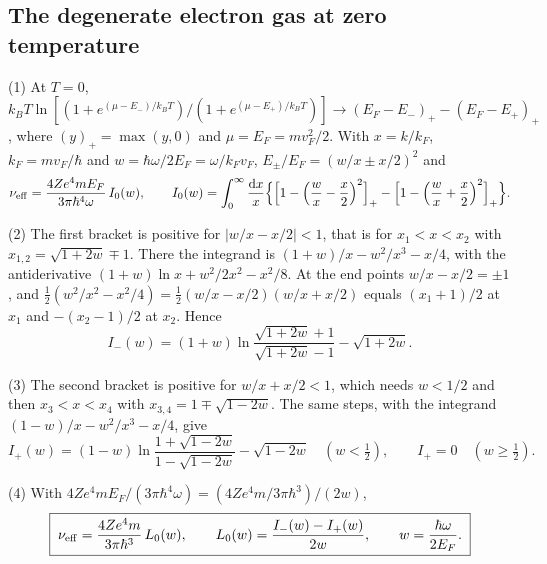 \documentclass[11pt]{article}
\numberwithin{equation}{section}
\newcommand{\nueff}{\nu_{\rm eff}}
\newcommand{\dd}{\mathrm d}
\newcommand{\kB}{k_B}
\begin{document}
\subsection{The degenerate electron gas at zero temperature}
{\noindent}(1) At $T=0$, $\kB T\ln[(1+e^{(\mu-E_-)/\kB T})/(1+e^{(\mu-E_+)/\kB T})]
\to(E_F-E_-)_+-(E_F-E_+)_+$, where $(y)_+=\max(y,0)$ and $\mu=E_F=mv_F^2/2$.
With $x=k/k_F$, $k_F=mv_F/\hbar$ and $w=\hbar\omega/2E_F=\omega/k_Fv_F$,
$E_\pm/E_F=(w/x\pm x/2)^2$ and
\begin{equation}
\nueff=\frac{4Ze^4mE_F}{3\pi\hbar^4\omega}\,I_0(w),\qquad
I_0(w)=\int_0^\infty\frac{\dd x}{x}\Big\{\Big[1-\Big(\frac wx-\frac x2\Big)^2\Big]_+
-\Big[1-\Big(\frac wx+\frac x2\Big)^2\Big]_+\Big\}.
\end{equation}

{\noindent}(2) The first bracket is positive for $|w/x-x/2|<1$, that is for
$x_1<x<x_2$ with $x_{1,2}=\sqrt{1+2w}\mp1$. There the integrand is
$(1+w)/x-w^2/x^3-x/4$, with the antiderivative $(1+w)\ln x+w^2/2x^2-x^2/8$.
At the end points $w/x-x/2=\pm1$, and
$\tfrac12(w^2/x^2-x^2/4)=\tfrac12(w/x-x/2)(w/x+x/2)$ equals $(x_1+1)/2$ at $x_1$
and $-(x_2-1)/2$ at $x_2$. Hence
\begin{equation}
I_-(w)=(1+w)\ln\frac{\sqrt{1+2w}+1}{\sqrt{1+2w}-1}-\sqrt{1+2w}.
\end{equation}

{\noindent}(3) The second bracket is positive for $w/x+x/2<1$, which needs
$w<1/2$ and then $x_3<x<x_4$ with $x_{3,4}=1\mp\sqrt{1-2w}$. The same steps,
with the integrand $(1-w)/x-w^2/x^3-x/4$, give
\begin{equation}
I_+(w)=(1-w)\ln\frac{1+\sqrt{1-2w}}{1-\sqrt{1-2w}}-\sqrt{1-2w}\quad(w<\tfrac12),\qquad I_+=0\quad(w\geq\tfrac12).
\end{equation}

{\noindent}(4) With $4Ze^4mE_F/(3\pi\hbar^4\omega)=(4Ze^4m/3\pi\hbar^3)/(2w)$,
\begin{equation}
\boxed{\;\nueff=\frac{4Ze^4m}{3\pi\hbar^3}\,L_0(w),\qquad L_0(w)=\frac{I_-(w)-I_+(w)}{2w},\qquad
w=\frac{\hbar\omega}{2E_F}.\;}
\label{eq:nu-T0}
\end{equation}
\end{document}
